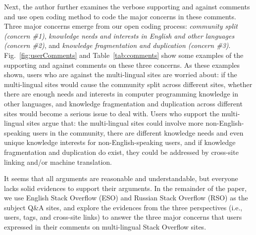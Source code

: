 Next, the author further examines the verbose supporting and against comments and use open coding method to code the major concerns in these comments.
Three major concerns emerge from our open coding process:
\textit{community split (concern \#1)}, \textit{knowledge needs and interests in English and other languages (concern \#2)}, and \textit{knowledge fragmentation and duplication (concern \#3)}.
Fig.~\ref{fig:userComments} and Table~\ref{tab:comments} show some examples of the supporting and against comments on these three concerns.
As these examples shown, users who are against the multi-lingual sites are worried about: if the multi-lingual sites would cause the community split across different sites, whether there are enough needs and interests in computer programming knowledge in other languages, and knowledge fragmentation and duplication across different sites would become a serious issue to deal with.
Users who support the multi-lingual sites argue that: the multi-lingual sites could involve more non-English-speaking users in the community, there are different knowledge needs and even unique knowledge interests for non-English-speaking users, and if knowledge fragmentation and duplication do exist, they could be addressed by cross-site linking and/or machine translation.

\begin{comment}
Different developers have different opinions about the decision to launch the multi-lingual Stack Overflow.
Some positive and negative comments can be seen in Table~\ref{tab:comments}.
The developers support multi-lingual Stack Overflow because it can provide a help for non-English speakers, and language should not be the barrier for software development.
However, people against the decision are mainly afraid of the fragmentation and duplication of the knowledge into different sites and regard English as a prerequisite for programming because most documents and code are written in English.
They are especially concerned with the potential negative influence of new site to Stack Overflow like community split.
\end{comment}

It seems that all arguments are reasonable and understandable, but everyone lacks solid evidences to support their arguments.
In the remainder of the paper, we use English Stack Overflow (ESO) and Russian Stack Overflow (RSO) as the subject Q\&A sites, and explore the evidences from the three perspectives (i.e., users, tags, and cross-site links) to answer the three major concerns that users expressed in their comments on multi-lingual Stack Overflow sites.


